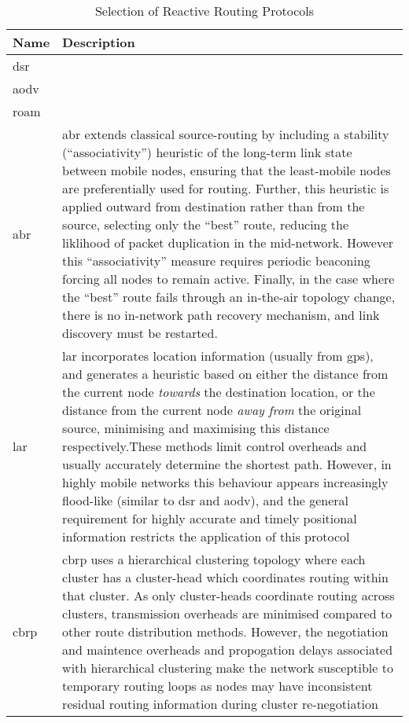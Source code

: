 \begin{table}\centering
  \caption[Selection of Reactive Routing Protocols]{Selection of Reactive Routing Protocols}
  \label{tab:reactive_routing_protocols}
  \begin{tabularx}{\textwidth}{p{1.25cm}|X}\toprule
    Name & Description \\ \midrule
    \gls{dsr} & \cite{Johnson1996} \\
    \gls{aodv} & \\
    \gls{roam} & \\
    \gls{abr} & \acrlong{abr} extends classical source-routing by including a stability (``associativity'') heuristic of the long-term link state between mobile nodes, ensuring that the least-mobile nodes are preferentially used for routing. Further, this heuristic is applied outward from destination rather than from the source, selecting only the ``best'' route, reducing the liklihood of packet duplication in the mid-network. However this ``associativity'' measure requires periodic beaconing forcing all nodes to remain active. Finally, in the case where the ``best'' route fails through an in-the-air topology change, there is no in-network path recovery mechanism, and link discovery must be restarted\cite{Toh1997}.\\
    \gls{lar} & \acrlong{lar} incorporates location information (usually from \gls{gps}), and generates a heuristic based on either the distance from the current node \emph{towards} the destination location, or the distance from the current node \emph{away from} the original source, minimising and maximising this distance respectively.These methods limit control overheads and usually accurately determine the shortest path. However, in highly mobile networks this behaviour appears increasingly flood-like (similar to \gls{dsr} and \gls{aodv}), and the general requirement for highly accurate and timely positional information restricts the application of this protocol\\
    \gls{cbrp} & \acrlong{cbrp} uses a hierarchical clustering topology where each cluster has a cluster-head which coordinates routing within that cluster. As only cluster-heads coordinate routing across clusters, transmission overheads are minimised compared to other route distribution methods. However, the negotiation and maintence overheads and propogation delays associated with hierarchical clustering make the network susceptible to temporary routing loops as nodes may have inconsistent residual routing information during cluster re-negotiation\\
    
    \bottomrule
  \end{tabularx}
\end{table}

